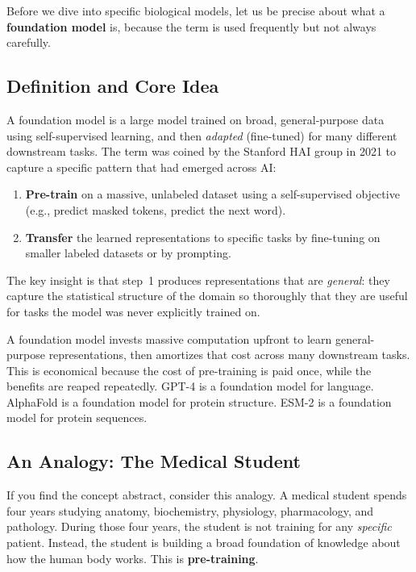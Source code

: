 Before we dive into specific biological models, let us be precise about what a \textbf{foundation model} is, because the term is used frequently but not always carefully.

\subsection{Definition and Core Idea}

A foundation model is a large model trained on broad, general-purpose data using self-supervised learning, and then \emph{adapted} (fine-tuned) for many different downstream tasks. The term was coined by the Stanford HAI group in 2021 to capture a specific pattern that had emerged across AI:

\begin{enumerate}[leftmargin=1.8em]
  \item \textbf{Pre-train} on a massive, unlabeled dataset using a self-supervised objective (e.g., predict masked tokens, predict the next word).
  \item \textbf{Transfer} the learned representations to specific tasks by fine-tuning on smaller labeled datasets or by prompting.
\end{enumerate}

The key insight is that step~1 produces representations that are \emph{general}: they capture the statistical structure of the domain so thoroughly that they are useful for tasks the model was never explicitly trained on.

\begin{keyinsight}
A foundation model invests massive computation upfront to learn general-purpose representations, then amortizes that cost across many downstream tasks. This is economical because the cost of pre-training is paid once, while the benefits are reaped repeatedly. GPT-4 is a foundation model for language. AlphaFold is a foundation model for protein structure. ESM-2 is a foundation model for protein sequences.
\end{keyinsight}

\subsection{An Analogy: The Medical Student}

If you find the concept abstract, consider this analogy. A medical student spends four years studying anatomy, biochemistry, physiology, pharmacology, and pathology. During those four years, the student is not training for any \emph{specific} patient. Instead, the student is building a broad foundation of knowledge about how the human body works. This is \textbf{pre-training}.

